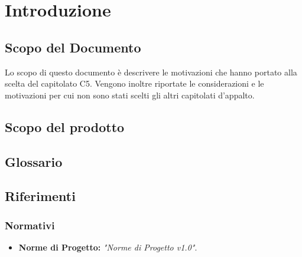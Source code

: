 \documentclass[a4paper, titlepage]{article}
\begin{document}
\pagestyle{fancy}	

\maketitle



\newpage

\tableofcontents\label{lastromanpage}

\newpage
\clearpage
{}
\hypersetup{linkcolor=blue}

\section{Introduzione}
\subsection{Scopo del Documento}
Lo scopo di questo documento è descrivere le motivazioni che hanno portato
alla scelta del capitolato C5. Vengono inoltre riportate le considerazioni
e le motivazioni per cui non sono stati scelti gli altri capitolati d'appalto.

\subsection{Scopo del prodotto}
\SCOPO

\subsection{Glossario}
\GLOSSARIO

\subsection{Riferimenti}

\subsubsection{Normativi}
\begin{itemize}
	\item \textbf{Norme di Progetto: }\textit{"Norme di Progetto v1.0"}.
\end{itemize}
\end{document}
